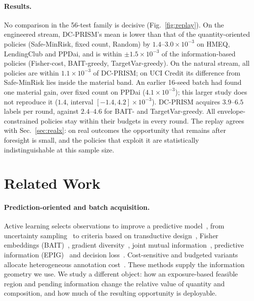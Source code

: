 \documentclass[runningheads]{llncs}
\begin{document}
\paragraph{Results.} No comparison in the 56-test family is decisive (Fig.~\ref{fig:replay}). On the engineered stream, DC-PRISM's mean is lower than that of the quantity-oriented policies (Safe-MinRisk, fixed count, Random) by $1.4$--$3.0\times10^{-3}$ on HMEQ, LendingClub and PPDai, and is within $\pm1.5\times10^{-3}$ of the information-based policies (Fisher-cost, BAIT-greedy, TargetVar-greedy). On the natural stream, all policies are within $1.1\times10^{-3}$ of DC-PRISM; on UCI Credit its difference from Safe-MinRisk lies inside the material band. An earlier 16-seed batch had found one material gain, over fixed count on PPDai ($4.1\times10^{-3}$); this larger study does not reproduce it ($1.4$, interval $[-1.4,4.2]\times10^{-3}$). DC-PRISM acquires $3.9$--$6.5$ labels per round, against $2.4$--$4.6$ for BAIT- and TargetVar-greedy. All envelope-constrained policies stay within their budgets in every round. The replay agrees with Sec.~\ref{sec:realx}: on real outcomes the opportunity that remains after foresight is small, and the policies that exploit it are statistically indistinguishable at this sample size.

\section{Related Work}
\label{sec:related}
\paragraph{Prediction-oriented and batch acquisition.} Active learning selects observations to improve a predictive model~\cite{cohn1996active,settles2009active}, from uncertainty sampling~\cite{lewis1994sequential} to criteria based on transductive design~\cite{yu2006transductive}, Fisher embeddings (BAIT)~\cite{ash2021fishing}, gradient diversity~\cite{ash2020badge}, joint mutual information~\cite{kirsch2019batchbald}, predictive information (EPIG)~\cite{bickfordsmith2023prediction} and decision loss~\cite{huang2026loss}. Cost-sensitive and budgeted variants allocate heterogeneous annotation cost~\cite{tomanek2010cost,morato2025conbatch}. These methods supply the information geometry we use. We study a different object: how an exposure-based feasible region and pending information change the relative value of quantity and composition, and how much of the resulting opportunity is deployable.
\end{document}
